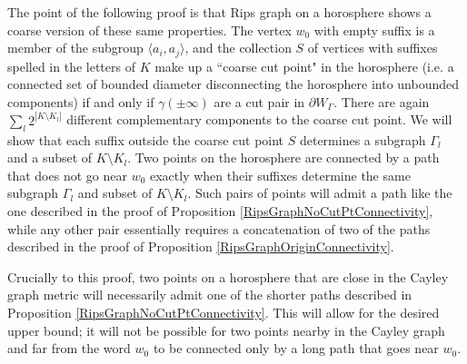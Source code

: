 \documentclass[10pt,a4paper]{amsart}
\theoremstyle{definition}
\theoremstyle{remark}
\begin{document}
    The point of the following proof is that Rips graph on a horosphere shows a coarse version of these same properties. The vertex $w_0$ with empty suffix is a member of the subgroup $\langle a_i, a_j\rangle$, and the collection $S$ of vertices with suffixes spelled in the letters of $K$ make up a ``coarse cut point"  in the horosphere (i.e. a connected set of bounded diameter disconnecting the horosphere into unbounded components) if and only if $\gamma(\pm\infty)$ are a cut pair in $\partial W_\Gamma$. There are again $\sum_l 2^{|K\setminus K_l|}$ different complementary components to the coarse cut point. We will show that each suffix outside the coarse cut point $S$ determines a subgraph $\Gamma_l$ and a subset of $K\setminus K_l$. Two points on the horosphere are connected by a path that does not go near $w_0$ exactly when their suffixes determine the same subgraph $\Gamma_l$ and subset of $K\setminus K_l$. Such pairs of points will admit a path like the one described in the proof of Proposition \ref{RipsGraphNoCutPtConnectivity}, while any other pair essentially requires a concatenation of two of the paths described in the proof of Proposition \ref{RipsGraphOriginConnectivity}.

    Crucially to this proof, two points on a horosphere that are close in the Cayley graph metric will necessarily admit one of the shorter paths described in Proposition \ref{RipsGraphNoCutPtConnectivity}. This will allow for the desired upper bound; it will not be possible for two points nearby in the Cayley graph and far from the word $w_0$ to be connected only by a long path that goes near $w_0$.
	
\end{document}
